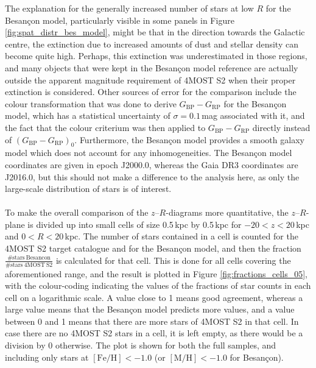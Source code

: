 \documentclass[a4paper,11pt]{article}
\begin{document}
%
The explanation for the generally increased number of stars at low $R$ for the Besan\c{c}on model, particularly visible in some panels in Figure \ref{fig:spat_distr_bes_model}, might be that in the direction towards the Galactic centre, the extinction due to increased amounts of dust and stellar density can become quite high. Perhaps, this extinction was underestimated in those regions, and many objects that were kept in the Besan\c{c}on model reference are actually outside the apparent magnitude requirement of 4MOST S2 when their proper extinction is considered. Other sources of error for the comparison include the colour transformation that was done to derive $G_\mathrm{BP}-G_\mathrm{RP}$ for the Besan\c{c}on model, which has a statistical uncertainty of $\sigma=0.1$\,mag associated with it, and the fact that the colour criterium was then applied to $G_\mathrm{BP}-G_\mathrm{RP}$ directly instead of $(G_\mathrm{BP}-G_\mathrm{RP})_0$. Furthermore, the Besan\c{c}on model provides a smooth galaxy model which does not account for any inhomogeneities. The Besan\c{c}on model coordinates are given in epoch J2000.0, whereas the Gaia DR3 coordinates are J2016.0, but this should not make a difference to the analysis here, as only the large-scale distribution of stars is of interest.\\ \\
%
To make the overall comparison of the $z$--$R$-diagrams more quantitative, the $z$--$R$-plane is divided up into small cells of size 0.5\,kpc by 0.5\,kpc for $-20<z<20$\,kpc and $0<R<20$\,kpc. The number of stars contained in a cell is counted for the 4MOST S2 target catalogue and for the Besan\c{c}on model, and then the fraction $\frac{\mathrm{\# stars\ Besancon}}{\mathrm{\# stars\ 4MOST\ S2}}$ is calculated for that cell. This is done for all cells covering the aforementioned range, and the result is plotted in Figure \ref{fig:fractions_cells_05}, with the colour-coding indicating the values of the fractions of star counts in each cell on a logarithmic scale. A value close to 1 means good agreement, whereas a large value means that the Besan\c{c}on model predicts more values, and a value between 0 and 1 means that there are more stars of 4MOST S2 in that cell. In case there are no 4MOST S2 stars in a cell, it is left empty, as there would be a division by 0 otherwise. The plot is shown for both the full samples, and including only stars at $\mathrm{[Fe/H]}<-1.0$ (or $\mathrm{[M/H]}<-1.0$ for Besan\c{c}on).
%
\end{document}
